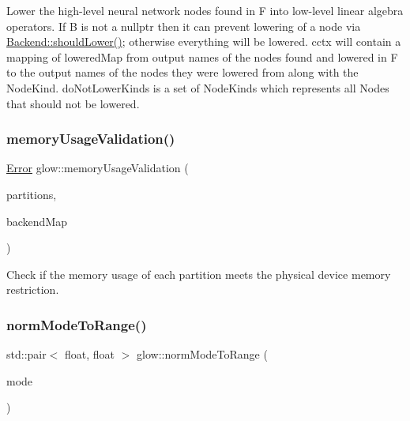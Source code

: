 Lower the high-\/level neural network nodes found in {\ttfamily F} into low-\/level linear algebra operators. If {\ttfamily B} is not a nullptr then it can prevent lowering of a node via \hyperlink{classglow_1_1_backend_aba5bec08f5e60626bcc5238f410d632a}{Backend\+::should\+Lower()}; otherwise everything will be lowered. {\ttfamily cctx} will contain a mapping of lowered\+Map from output names of the nodes found and lowered in {\ttfamily F} to the output names of the nodes they were lowered from along with the Node\+Kind. {\ttfamily do\+Not\+Lower\+Kinds} is a set of Node\+Kinds which represents all Nodes that should not be lowered. \mbox{\label{namespaceglow_a07a0a4dcd72e491d512294eec2ba422a}} 
\subsubsection{\texorpdfstring{memory\+Usage\+Validation()}{memoryUsageValidation()}}
{\footnotesize\ttfamily \hyperlink{namespaceglow_afdb176c3a672ef66db0ecfc19a8d39bf}{Error} glow\+::memory\+Usage\+Validation (\begin{DoxyParamCaption}\item[{const \hyperlink{classglow_1_1_node_to_function_map}{Node\+To\+Function\+Map} \&}]{partitions,  }\item[{const std\+::map$<$ std\+::string, \hyperlink{structglow_1_1_backend_info}{Backend\+Info} $>$ \&}]{backend\+Map }\end{DoxyParamCaption})}

Check if the memory usage of each partition meets the physical device memory restriction. \mbox{\label{namespaceglow_a300f3c7eeb3e5ee04d177a2acc6ac4db}} 
\subsubsection{\texorpdfstring{norm\+Mode\+To\+Range()}{normModeToRange()}}
{\footnotesize\ttfamily std\+::pair$<$ float, float $>$ glow\+::norm\+Mode\+To\+Range (\begin{DoxyParamCaption}\item[{\hyperlink{namespaceglow_af836699afb1d36a88df0d50d74fde931}{Image\+Normalization\+Mode}}]{mode }\end{DoxyParamCaption})}




